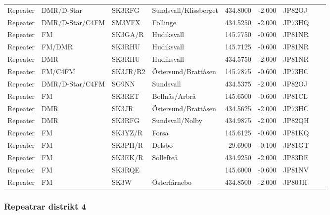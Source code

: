 \begin{longtable}{llllrrlcl}
	Repeater & DMR/D-Star      & SK3RFG   & Sundsvall/Klissberget  &   434.8000 &   -2.000 & JP82OJ &  &  \\
	Repeater & DMR/D-Star/C4FM & SM3YFX   & Föllinge               &   434.5250 &   -2.000 & JP73HQ &  &  \\
	Repeater & FM              & SK3GA/R  & Hudiksvall             &   145.7750 &   -0.600 & JP81NR &  &  \\
	Repeater & FM/DMR          & SK3RHU   & Hudiksvall             &   145.7125 &   -0.600 & JP81NR &  &  \\
	Repeater & DMR             & SK3RHU   & Hudiksvall             &   434.5750 &   -2.000 & JP81NR &  &  \\
	Repeater & FM/C4FM         & SK3JR/R2 & Östersund/Brattåsen    &   145.7875 &   -0.600 & JP73HC &  &  \\
	Repeater & DMR/D-Star/C4FM & SG9NN    & Sundsvall              &   434.5375 &   -2.000 & JP82OJ &  &  \\
	Repeater & FM              & SK3RET   & Bollnäs/Arbrå          &   145.6500 &   -0.600 & JP81CL &  &  \\
	Repeater & DMR             & SK3JR    & Östersund/Brattåsen    &   434.5625 &   -2.000 & JP73HC &  &  \\
	Repeater & DMR             & SK3RFG   & Sundsvall/Nolby        &   434.9875 &   -2.000 & JP82QH &  &  \\
	Repeater & FM              & SK3YZ/R  & Forsa                  &   145.6125 &   -0.600 & JP81KQ &  &  \\
	Repeater & FM              & SK3PH/R  & Delsbo                 &    29.6900 &   -0.100 & JP81GT &  &  \\
	Repeater & FM              & SK3EK/R  & Sollefteå              &   434.9250 &   -2.000 & JP83DE &  &  \\
	Repeater & FM              & SK3RQE   &                        &   145.6000 &   -0.600 & JP81NV &  &  \\
	Repeater & FM              & SK3W     & Österfärnebo           &   434.8500 &   -2.000 & JP80JH &  &
\end{longtable}

\subsubsection{Repeatrar distrikt 4}

